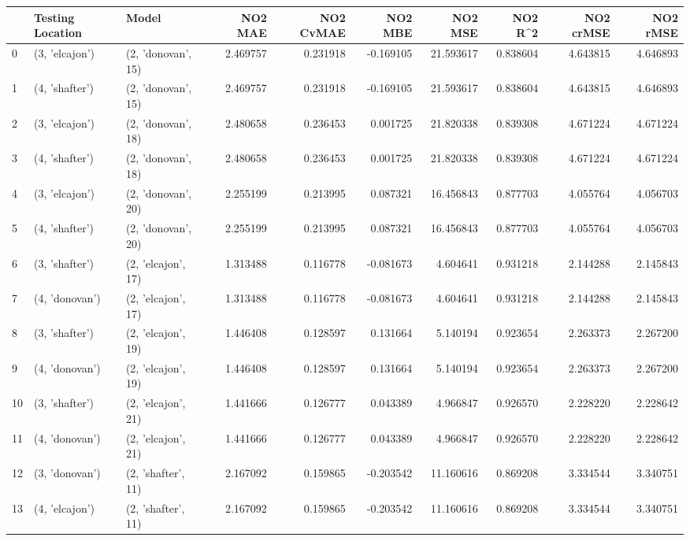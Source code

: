 \begin{tabular}{lllrrrrrrr}
\toprule
{} & Testing Location &               Model &   NO2 MAE &  NO2 CvMAE &   NO2 MBE &    NO2 MSE &   NO2 R\textasciicircum2 &  NO2 crMSE &  NO2 rMSE \\
\midrule
0  &   (3, 'elcajon') &  (2, 'donovan', 15) &  2.469757 &   0.231918 & -0.169105 &  21.593617 &  0.838604 &   4.643815 &  4.646893 \\
1  &   (4, 'shafter') &  (2, 'donovan', 15) &  2.469757 &   0.231918 & -0.169105 &  21.593617 &  0.838604 &   4.643815 &  4.646893 \\
2  &   (3, 'elcajon') &  (2, 'donovan', 18) &  2.480658 &   0.236453 &  0.001725 &  21.820338 &  0.839308 &   4.671224 &  4.671224 \\
3  &   (4, 'shafter') &  (2, 'donovan', 18) &  2.480658 &   0.236453 &  0.001725 &  21.820338 &  0.839308 &   4.671224 &  4.671224 \\
4  &   (3, 'elcajon') &  (2, 'donovan', 20) &  2.255199 &   0.213995 &  0.087321 &  16.456843 &  0.877703 &   4.055764 &  4.056703 \\
5  &   (4, 'shafter') &  (2, 'donovan', 20) &  2.255199 &   0.213995 &  0.087321 &  16.456843 &  0.877703 &   4.055764 &  4.056703 \\
6  &   (3, 'shafter') &  (2, 'elcajon', 17) &  1.313488 &   0.116778 & -0.081673 &   4.604641 &  0.931218 &   2.144288 &  2.145843 \\
7  &   (4, 'donovan') &  (2, 'elcajon', 17) &  1.313488 &   0.116778 & -0.081673 &   4.604641 &  0.931218 &   2.144288 &  2.145843 \\
8  &   (3, 'shafter') &  (2, 'elcajon', 19) &  1.446408 &   0.128597 &  0.131664 &   5.140194 &  0.923654 &   2.263373 &  2.267200 \\
9  &   (4, 'donovan') &  (2, 'elcajon', 19) &  1.446408 &   0.128597 &  0.131664 &   5.140194 &  0.923654 &   2.263373 &  2.267200 \\
10 &   (3, 'shafter') &  (2, 'elcajon', 21) &  1.441666 &   0.126777 &  0.043389 &   4.966847 &  0.926570 &   2.228220 &  2.228642 \\
11 &   (4, 'donovan') &  (2, 'elcajon', 21) &  1.441666 &   0.126777 &  0.043389 &   4.966847 &  0.926570 &   2.228220 &  2.228642 \\
12 &   (3, 'donovan') &  (2, 'shafter', 11) &  2.167092 &   0.159865 & -0.203542 &  11.160616 &  0.869208 &   3.334544 &  3.340751 \\
13 &   (4, 'elcajon') &  (2, 'shafter', 11) &  2.167092 &   0.159865 & -0.203542 &  11.160616 &  0.869208 &   3.334544 &  3.340751 \\

\end{tabular}
